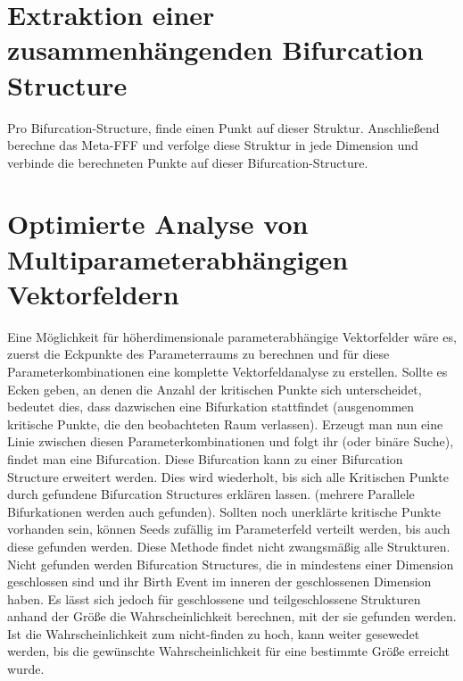 \documentclass[11pt]{article}
\begin{document}
\section{Extraktion einer zusammenhängenden Bifurcation Structure}
Pro Bifurcation-Structure, finde einen Punkt auf dieser Struktur. Anschließend berechne das Meta-FFF und verfolge diese Struktur in jede Dimension und verbinde die berechneten Punkte auf dieser Bifurcation-Structure.

\section{Optimierte Analyse von Multiparameterabhängigen Vektorfeldern}
Eine Möglichkeit für höherdimensionale parameterabhängige Vektorfelder wäre es, zuerst die Eckpunkte des Parameterraums zu berechnen und für diese Parameterkombinationen eine komplette Vektorfeldanalyse zu erstellen.
Sollte es Ecken geben, an denen die Anzahl der kritischen Punkte sich unterscheidet, bedeutet dies, dass dazwischen eine Bifurkation stattfindet (ausgenommen kritische Punkte, die den beobachteten Raum verlassen). Erzeugt man nun eine Linie zwischen diesen Parameterkombinationen und folgt ihr (oder binäre Suche), findet man eine Bifurcation. Diese Bifurcation kann zu einer Bifurcation Structure erweitert werden. Dies wird wiederholt, bis sich alle Kritischen Punkte durch gefundene Bifurcation Structures erklären lassen. (mehrere Parallele Bifurkationen werden auch gefunden). Sollten noch unerklärte kritische Punkte vorhanden sein, können Seeds zufällig im Parameterfeld verteilt werden, bis auch diese gefunden werden.
Diese Methode findet nicht zwangsmäßig alle Strukturen. Nicht gefunden werden Bifurcation Structures, die in mindestens einer Dimension geschlossen sind und ihr Birth Event im inneren der geschlossenen Dimension haben. Es lässt sich jedoch für geschlossene und teilgeschlossene Strukturen anhand der Größe die Wahrscheinlichkeit berechnen, mit der sie gefunden werden. Ist die Wahrscheinlichkeit zum nicht-finden zu hoch, kann weiter gesewedet werden, bis die gewünschte Wahrscheinlichkeit für eine bestimmte Größe erreicht wurde. 
\end{document}

